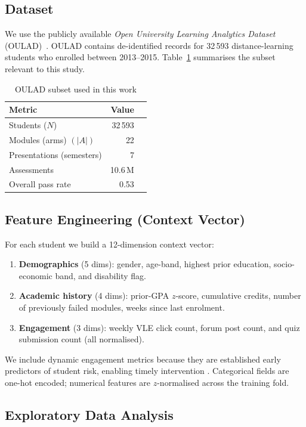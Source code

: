 \documentclass[conference]{IEEEtran}
\begin{document}
\subsection{Dataset}
We use the publicly available \textit{Open University Learning Analytics Dataset} (OULAD)~\cite{Kuzilek2017}.  
OULAD contains de-identified records for 32\,593 distance-learning students who enrolled between 2013–2015.  
Table~\ref{tab:oulad} summarises the subset relevant to this study.

\begin{table}[b]
  \caption{OULAD subset used in this work}
  \label{tab:oulad}
  \centering
  \begin{tabular}{lrr}
  \toprule
  Metric & Value \\
  \midrule
  Students ($N$)             & 32\,593 \\
  Modules (arms) $(|A|)$     & 22 \\
  Presentations (semesters)  & 7  \\
  Assessments                & 10.6\,M \\
  Overall pass rate          & 0.53 \\
  \bottomrule
  \end{tabular}
\end{table}

\subsection{Feature Engineering (Context Vector)}
For each student we build a 12-dimension context vector:
\begin{enumerate}
  \item \textbf{Demographics} (5 dims): gender, age-band, highest prior education, socio-economic band, and disability flag.
  \item \textbf{Academic history} (4 dims): prior-GPA $z$-score, cumulative credits, number of previously failed modules, weeks since last enrolment.
  \item \textbf{Engagement} (3 dims): weekly VLE click count, forum post count, and quiz submission count (all normalised).
\end{enumerate}
We include dynamic engagement metrics because they are established early predictors of student risk, enabling timely intervention \cite{kustitskaya2022}. Categorical fields are one-hot encoded; numerical features are $z$-normalised across the training fold.

\subsection{Exploratory Data Analysis}
\end{document}
